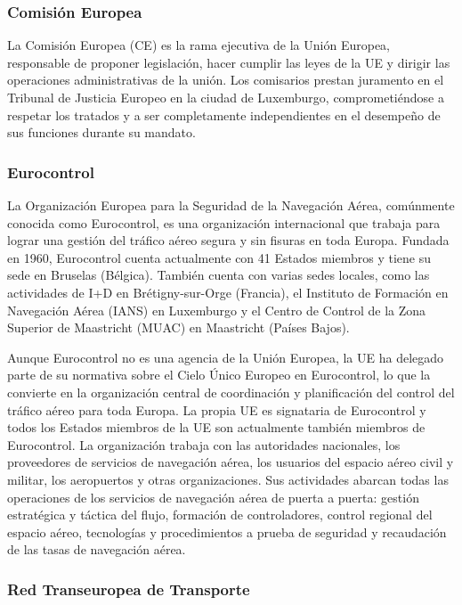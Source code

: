 \subsubsection{Comisión Europea}

La Comisión Europea (CE) es la rama ejecutiva de la Unión Europea, responsable de proponer legislación, hacer cumplir las leyes de la UE y dirigir las operaciones administrativas de la unión. Los comisarios prestan juramento en el Tribunal de Justicia Europeo en la ciudad de Luxemburgo, comprometiéndose a respetar los tratados y a ser completamente independientes en el desempeño de sus funciones durante su mandato.

\subsubsection{Eurocontrol}

La Organización Europea para la Seguridad de la Navegación Aérea, comúnmente conocida como Eurocontrol, es una organización internacional que trabaja para lograr una gestión del tráfico aéreo segura y sin fisuras en toda Europa. Fundada en 1960, Eurocontrol cuenta actualmente con 41 Estados miembros y tiene su sede en Bruselas (Bélgica). También cuenta con varias sedes locales, como las actividades de I+D en Brétigny-sur-Orge (Francia), el Instituto de Formación en Navegación Aérea (IANS) en Luxemburgo y el Centro de Control de la Zona Superior de Maastricht (MUAC) en Maastricht (Países Bajos). 

Aunque Eurocontrol no es una agencia de la Unión Europea, la UE ha delegado parte de su normativa sobre el Cielo Único Europeo en Eurocontrol, lo que la convierte en la organización central de coordinación y planificación del control del tráfico aéreo para toda Europa. La propia UE es signataria de Eurocontrol y todos los Estados miembros de la UE son actualmente también miembros de Eurocontrol. La organización trabaja con las autoridades nacionales, los proveedores de servicios de navegación aérea, los usuarios del espacio aéreo civil y militar, los aeropuertos y otras organizaciones. Sus actividades abarcan todas las operaciones de los servicios de navegación aérea de puerta a puerta: gestión estratégica y táctica del flujo, formación de controladores, control regional del espacio aéreo, tecnologías y procedimientos a prueba de seguridad y recaudación de las tasas de navegación aérea.

\subsubsection{Red Transeuropea de Transporte}

